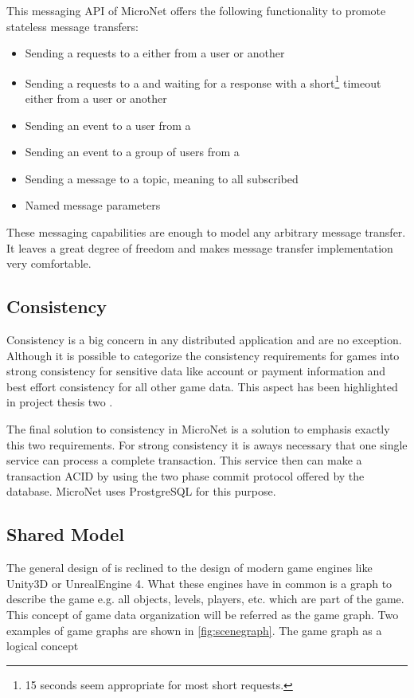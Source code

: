 This messaging API of MicroNet offers the following functionality to promote
stateless message transfers:

\begin{itemize}
  \item Sending a requests to a \ms{} either from a user or another \ms{}
  \item Sending a requests to a \ms{} and waiting for a response with a
  short\footnote{15 seconds seem appropriate for most short requests.} timeout
  either from a user or another \ms{}
  \item Sending an event to a user from a \ms{}
  \item Sending an event to a group of users from a \ms{}
  \item Sending a message to a topic, meaning to all subscribed \mss{}
  \item Named message parameters
\end{itemize}

These messaging capabilities are enough to model any arbitrary message transfer.
It leaves a great degree of freedom and makes message transfer implementation
very comfortable. 

\subsection{Consistency}

Consistency is a big concern in any distributed application and \ogs{} are no
exception. Although it is possible to categorize the consistency requirements
for games into strong consistency for sensitive data like account or payment
information and best effort consistency for all other game data. This aspect has
been highlighted in project thesis two .

The final solution to consistency in MicroNet is a solution to emphasis
exactly this two requirements. For strong consistency it is aways necessary that
one single service can process a complete transaction. This service then can
make a transaction ACID by using the two phase commit protocol offered by the
database. MicroNet uses ProstgreSQL for this purpose.

\subsection{Shared Model}

The general design of \mn{} is reclined to the design of modern game engines
like Unity3D or UnrealEngine 4. What these engines have in common is a graph to
describe the game e.g. all objects, levels, players, etc. which are part of the
game. This concept of game data organization will be referred as the game graph.
Two examples of game graphs are shown in \autoref{fig:scenegraph}. The game
graph as a logical concept 


